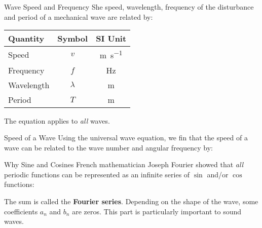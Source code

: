 \documentclass[12pt,aspectratio=169]{beamer}
\newcommand{\eq}[2]{\vspace{#1}{\Large\begin{displaymath}#2\end{displaymath}}}
\begin{document}
\begin{frame}{Wave Speed and Frequency}
  She speed, wavelength, frequency of the disturbance and period of
  a mechanical wave are related by:

  \eq{-.15in}{
    \boxed{v = f\lambda =\frac{\lambda}T}
  }
  \begin{center}
    \begin{tabular}{l|c|c}
      \rowcolor{pink}
      \textbf{Quantity} & \textbf{Symbol} & \textbf{SI Unit} \\ \hline
      Speed         & $v$       & \si{\metre\per\second} \\
      Frequency     & $f$       & \si\hertz \\
      Wavelength    & $\lambda$ & \si\metre \\
      Period        & $T$       & \si\metre 
    \end{tabular}
  \end{center}
  The equation applies to \emph{all} waves. %
\end{frame}




\begin{frame}{Speed of a Wave}
  Using the universal wave equation, we fin that the speed of a wave can be
  related to the wave number and angular frequency by:

  \eq{-.2in}{
    v=\frac{\lambda}T=\frac{2\pi/k}{2\pi/\omega}=\frac{\omega}k
  }
\end{frame}



\begin{frame}{Why Sine and Cosines}
  French mathematician Joseph Fourier showed that \emph{all} periodic functions
  can be represented as an infinite series of $\sin$ and/or $\cos$ functions:


  The sum is called the \textbf{Fourier series}. Depending on the shape of the
  wave, some coefficients $a_n$ and $b_n$ are zeros. This part is particularly
  important to sound waves.
\end{frame}
\end{document}
